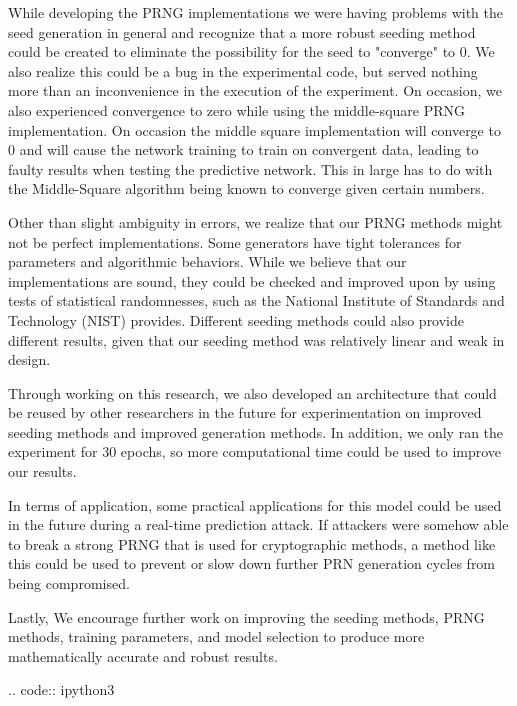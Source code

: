\documentclass[conference]{IEEEtran}
\begin{document}
While developing the PRNG implementations we were having problems with the seed generation in general and recognize that a more robust seeding method could be created to eliminate the possibility for the seed to "converge" to 0. We also realize this could be a bug in the experimental code, but served nothing more than an inconvenience in the execution of the experiment. On occasion, we also experienced convergence to zero while using the middle-square PRNG implementation. On occasion the middle square implementation will converge to 0 and will cause the network training to train on convergent data, leading to faulty results when testing the predictive network. This in large has to do with the Middle-Square algorithm being known to converge given certain numbers.

Other than slight ambiguity in errors, we realize that our PRNG methods might not be perfect implementations. Some generators have tight tolerances for parameters and algorithmic behaviors. While we believe that our implementations are sound, they could be checked and improved upon by using tests of statistical randomnesses, such as the National Institute of Standards and Technology (NIST) provides. 
Different seeding methods could also provide different results, given that our seeding method was relatively linear and weak in design.

Through working on this research, we also developed an architecture that could be reused by other researchers in the future for experimentation on improved seeding methods and improved generation methods. In addition, we only ran the experiment for 30 epochs, so more computational time could be used to improve our results.

In terms of application, some practical applications for this model could be used in the future during a real-time prediction attack. If attackers were somehow able to break a strong PRNG that is used for cryptographic methods, a method like this could be used to prevent or slow down further PRN generation cycles from being compromised. 

Lastly, We encourage further work on improving the seeding methods, PRNG methods, training parameters, and model selection to produce more mathematically accurate and robust results.

.. code:: ipython3

    
\end{document}
